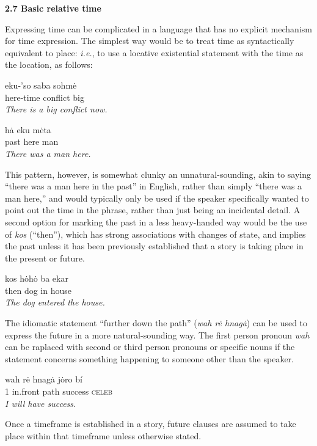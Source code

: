 \documentclass{article}[10pt]
\begin{document}
{\bf 2.7 Basic relative time}

Expressing time can be complicated in a language that has no explicit mechanism for time expression. The simplest way would be to treat time as syntactically equivalent to place: \emph{i.e.}, to use a locative existential statement with the time as the location, as follows:
\begin{exe}
\ex
\gll eku-'so saba sohm\.{e}\\
here-time conflict big\\
\trans \emph{There is a big conflict now.}

\ex 
\gll h\.{a} eku m\.{e}ta\\
past here man\\
\trans \emph{There was a man here.}
\end{exe}

This pattern, however, is somewhat clunky an unnatural-sounding, akin to saying ``there was a man here in the past'' in English, rather than simply ``there was a man here,'' and would typically only be used if the speaker specifically wanted to point out the time in the phrase, rather than just being an incidental detail. A second option for marking the past in a less heavy-handed way would be the use of \emph{kos} (``then''), which has strong associations with changes of state, and implies the past unless it has been previously established that a story is taking place in the present or future.
\begin{exe}
\ex
\gll kos h\.{o}h\.{o} ba ekar\\
then dog in house\\
\trans \emph{The dog entered the house.}
\end{exe}

The idiomatic statement ``further down the path'' (\emph{wah r\.{e} hnag\.{a}}) can be used to express the future in a more natural-sounding way. The first person pronoun \emph{wah} can be raplaced with second or third person pronouns or specific nouns if the statement concerns something happening to someone other than the speaker.
\begin{exe}
\ex 
\gll wah r\.{e} hnag\.{a} j\.{o}ro b\'{i}\\
1 in.front path success \textsc{celeb}\\
\trans \emph{I will have success.}
\end{exe}

Once a timeframe is established in a story, future clauses are assumed to take place within that timeframe unless otherwise stated.\\
\end{document}
